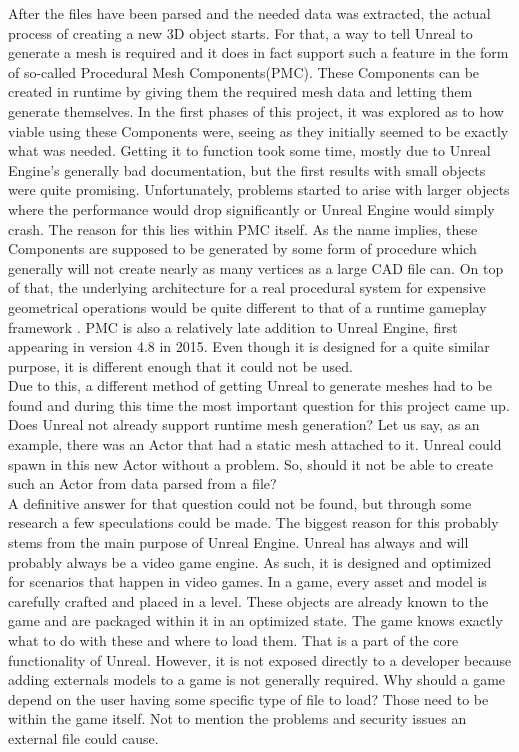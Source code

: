 After the files have been parsed and the needed data was extracted, the actual process of creating a new 3D object starts. For that, a way to tell Unreal to generate a mesh is required and it does in fact support such a feature in the form of so-called Procedural Mesh Components(\acs{PMC})\cite{bib:UEPawn}. These Components can be created in runtime by giving them the required mesh data and letting them generate themselves. In the first phases of this project, it was explored as to how viable using these Components were, seeing as they initially seemed to be exactly what was needed. Getting it to function took some time, mostly due to Unreal Engine's generally bad documentation, but the first results with small objects were quite promising. Unfortunately, problems started to arise with larger objects where the performance would drop significantly or Unreal Engine would simply crash. The reason for this lies within \acs{PMC} itself. As the name implies, these Components are supposed to be generated by some form of procedure which generally will not create nearly as many vertices as a large \acs{CAD} file can. On top of that, the underlying architecture for a real procedural system for expensive geometrical operations would be quite different to that of a runtime gameplay framework \cite{bib:ProcProb}. \acs{PMC} is also a relatively late addition to Unreal Engine, first appearing in version 4.8 in 2015. Even though it is designed for a quite similar purpose, it is different enough that it could not be used.\\
Due to this, a different method of getting Unreal to generate meshes had to be found and during this time the most important question for this project came up. Does Unreal not already support runtime mesh generation? Let us say, as an example, there was an Actor that had a static mesh attached to it. Unreal could spawn in this new Actor without a problem. So, should it not be able to create such an Actor from data parsed from a file?\\
A definitive answer for that question could not be found, but through some research a few speculations could be made. The biggest reason for this probably stems from the main purpose of Unreal Engine. Unreal has always and will probably always be a video game engine. As such, it is designed and optimized for scenarios that happen in video games. In a game, every asset and model is carefully crafted and placed in a level. These objects are already known to the game and are packaged within it in an optimized state. The game knows exactly what to do with these and where to load them. That is a part of the core functionality of Unreal. However, it is not exposed directly to a developer because adding externals models to a game is not generally required. Why should a game depend on the user having some specific type of file to load? Those need to be within the game itself. Not to mention the problems and security issues an external file could cause.\\
